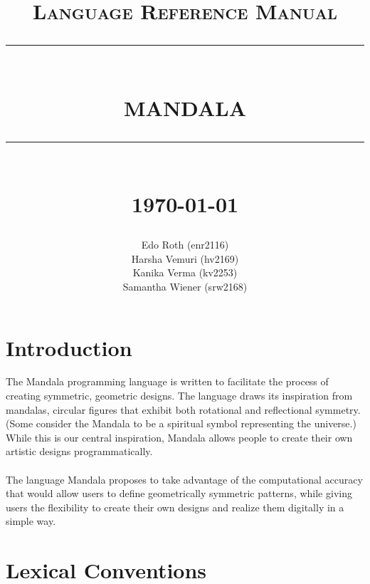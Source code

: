 \documentclass[12pt]{report}
\newcommand{\HRule}[1]{\rule{\linewidth}{#1}}
\begin{document}
\title{ \normalsize \textsc{Language Reference Manual}
		\\ [2.0cm]
		\HRule{0.5pt} \\
		\LARGE \textbf{\uppercase{MANDALA}}
		\HRule{2pt} \\ [0.5cm]
		\normalsize \today \vspace*{5\baselineskip}}

\date{}

\author{
		Edo Roth (enr2116) \\ 
		Harsha Vemuri (hv2169) \\ 
        Kanika Verma (kv2253) \\ 
		Samantha Wiener (srw2168)
		}

\maketitle
\tableofcontents
\newpage

\sectionfont{\scshape}


\section*{Introduction}

The Mandala programming language is written to facilitate the process of creating symmetric, geometric designs. The language draws its inspiration from mandalas, circular figures that exhibit both rotational and reflectional symmetry. (Some consider the Mandala to be a spiritual symbol representing the universe.) While this is our central inspiration, Mandala allows people to create their own artistic designs programmatically.
\\ \\
The language Mandala proposes to take advantage of the computational accuracy that would allow users to define geometrically symmetric patterns, while giving users the flexibility to create their own designs and realize them digitally in a simple way.

\newpage
{}
\section*{Lexical Conventions}
\end{document}
